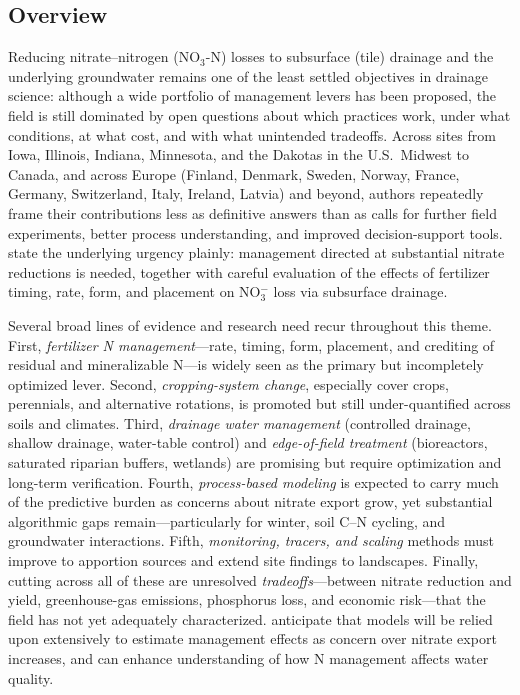 \subsection{Overview}
Reducing nitrate--nitrogen (NO$_3$-N) losses to subsurface (tile) drainage and the underlying groundwater remains one of the least settled objectives in drainage science: although a wide portfolio of management levers has been proposed, the field is still dominated by open questions about which practices work, under what conditions, at what cost, and with what unintended tradeoffs. Across sites from Iowa, Illinois, Indiana, Minnesota, and the Dakotas in the U.S.\ Midwest to Canada, and across Europe (Finland, Denmark, Sweden, Norway, France, Germany, Switzerland, Italy, Ireland, Latvia) and beyond, authors repeatedly frame their contributions less as definitive answers than as calls for further field experiments, better process understanding, and improved decision-support tools. \textcite{ROSSI1991} state the underlying urgency plainly: management directed at substantial nitrate reductions is needed, together with careful evaluation of the effects of fertilizer timing, rate, form, and placement on NO$_3^-$ loss via subsurface drainage.

Several broad lines of evidence and research need recur throughout this theme. First, \emph{fertilizer N management}---rate, timing, form, placement, and crediting of residual and mineralizable N---is widely seen as the primary but incompletely optimized lever. Second, \emph{cropping-system change}, especially cover crops, perennials, and alternative rotations, is promoted but still under-quantified across soils and climates. Third, \emph{drainage water management} (controlled drainage, shallow drainage, water-table control) and \emph{edge-of-field treatment} (bioreactors, saturated riparian buffers, wetlands) are promising but require optimization and long-term verification. Fourth, \emph{process-based modeling} is expected to carry much of the predictive burden as concerns about nitrate export grow, yet substantial algorithmic gaps remain---particularly for winter, soil C--N cycling, and groundwater interactions. Fifth, \emph{monitoring, tracers, and scaling} methods must improve to apportion sources and extend site findings to landscapes. Finally, cutting across all of these are unresolved \emph{tradeoffs}---between nitrate reduction and yield, greenhouse-gas emissions, phosphorus loss, and economic risk---that the field has not yet adequately characterized. \textcite{Du2017} anticipate that models will be relied upon extensively to estimate management effects as concern over nitrate export increases, and can enhance understanding of how N management affects water quality.


